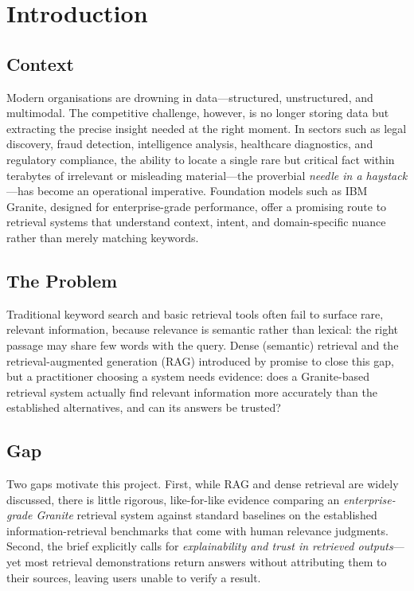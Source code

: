 \section{Introduction}

\subsection{Context}

Modern organisations are drowning in data---structured, unstructured, and
multimodal. The competitive challenge, however, is no longer storing data but
extracting the precise insight needed at the right moment. In sectors such as
legal discovery, fraud detection, intelligence analysis, healthcare diagnostics,
and regulatory compliance, the ability to locate a single rare but critical fact
within terabytes of irrelevant or misleading material---the proverbial
\emph{needle in a haystack}---has become an operational imperative. Foundation
models such as IBM Granite, designed for enterprise-grade performance, offer a
promising route to retrieval systems that understand context, intent, and
domain-specific nuance rather than merely matching keywords.

\subsection{The Problem}

Traditional keyword search and basic retrieval tools often fail to surface rare,
relevant information, because relevance is semantic rather than lexical: the
right passage may share few words with the query. Dense (semantic) retrieval and
the retrieval-augmented generation (RAG) introduced by \textcite{lewis2020rag}
promise to close this gap, but a practitioner choosing a system needs evidence: does a
Granite-based retrieval system actually find relevant information more accurately
than the established alternatives, and can its answers be trusted?

\subsection{Gap}

Two gaps motivate this project. First, while RAG and dense retrieval are widely
discussed, there is little rigorous, like-for-like evidence comparing an
\emph{enterprise-grade Granite} retrieval system against standard baselines on
the established information-retrieval benchmarks that come with human relevance
judgments. Second, the brief explicitly calls for \emph{explainability and trust
in retrieved outputs}---yet most retrieval demonstrations return answers without
attributing them to their sources, leaving users unable to verify a result.

